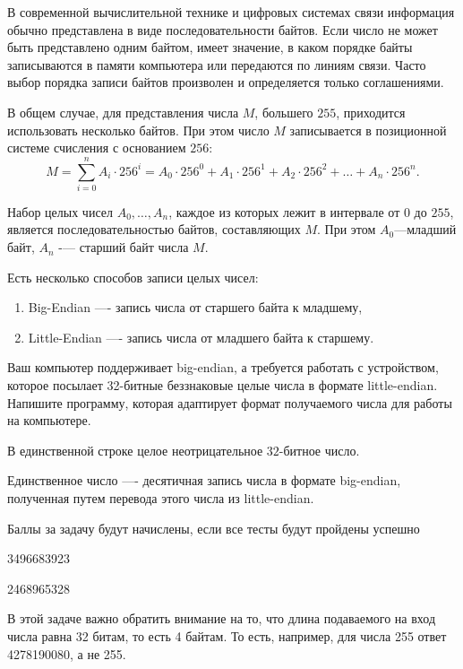 
В современной вычислительной технике и цифровых системах связи информация обычно представлена в виде последовательности байтов. Если число не может быть представлено одним байтом, имеет значение, в каком порядке байты записываются в памяти компьютера или передаются по линиям связи. Часто выбор порядка записи байтов произволен и определяется только соглашениями.

В общем случае, для представления числа $M$, большего $255$, приходится использовать несколько байтов. При этом число $M$ записывается в позиционной системе счисления с основанием $256$:
$$ M=\sum\limits _{i=0}^{n}A_{i}\cdot 256^{i}=A_{0}\cdot 256^{0}+A_{1}\cdot 256^{1}+A_{2}\cdot 256^{2}+\dots +A_{n}\cdot 256^{n}. $$

Набор целых чисел $ A_{0},\dots ,A_{n} $, каждое из которых лежит в интервале от $ 0 $ до $ 255 $, является последовательностью байтов, составляющих $ M $. При этом $ A_{0} $—младший байт, $  A_{n}  $ -— старший байт числа $ M$.

Есть несколько способов записи целых чисел:

\begin{enumerate}
    \item Big-Endian —- запись числа от старшего байта к младшему,
    \item Little-Endian —- запись числа от младшего байта к старшему.
\end{enumerate}

Ваш компьютер поддерживает big-endian, а требуется работать с устройством, которое посылает 32-битные беззнаковые целые числа в формате little-endian. Напишите программу, которая адаптирует формат получаемого числа для работы на компьютере. 



В единственной строке целое неотрицательное $ 32 $-битное число.

\outputfmtSection

Единственное число —- десятичная запись числа в формате big-endian, полученная путем перевода этого числа из little-endian.

\markSection

Баллы за задачу будут начислены, если все тесты будут пройдены успешно


\begin{myverbbox}[\small]{\vinput}
3496683923
\end{myverbbox}
\begin{myverbbox}[\small]{\voutput}
2468965328
\end{myverbbox}

\solutionSection

В этой задаче важно обратить внимание на то, что длина подаваемого на вход числа равна 32 битам, то есть 4 байтам. То есть, например, для числа 255 ответ 4278190080, а не 255.

